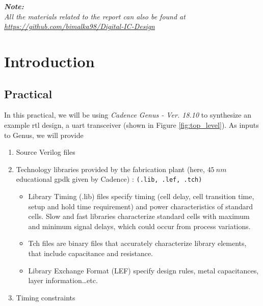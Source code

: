 \documentclass[a4paper,11pt]{article}%
\begin{document}


\pagebreak

\tableofcontents
\vfill
\textit{\textbf{Note:}}\\
\textit{All the materials related to the report can also be found at \url{https://github.com/bimalka98/Digital-IC-Design}}

\pagebreak
\listoffigures
\listoftables




\pagebreak
\section{Introduction}

\subsection{Practical}
In this practical, we will be using \textit{Cadence Genus - Ver. 18.10 } to synthesize an example \ac{rtl} design, a \ac{uart} transceiver (shown in Figure \ref{fig:top_level}). As inputs to Genus, we will provide

\begin{enumerate}
	\item Source Verilog files
	\item Technology libraries provided by the fabrication plant (here, $45~nm$ educational \ac{gpdk} given by Cadence) : {\tt (.lib, .lef, .tch)}
	
	\begin{itemize}
		\item Library Timing (.lib) files specify timing (cell delay, cell transition time, setup and hold time requirement) and power characteristics of standard cells. Slow and fast libraries 	characterize standard cells with maximum and minimum signal delays, which could occur from process variations.

		\item Tch files are binary files that accurately characterize library elements, that include  capacitance and resistance.
		
		\item Library Exchange Format (LEF) specify design rules, metal capacitances, layer information…etc.
	\end{itemize}
	
	\item Timing constraints
\end{enumerate}
\end{document}
